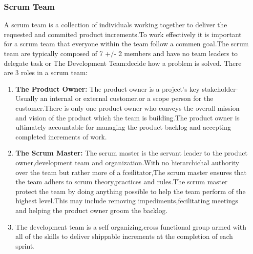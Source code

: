 \documentclass[a4paper, 12pt]{report}
\begin{document}
\subsubsection{Scrum Team} A scrum team is a collection of individuals working together to deliver the requested and commited product increments.To work eﬀectively it is important for a scrum team that everyone within the team follow a commen goal.The scrum team are typically composed of 7 +/- 2 members and have no team leaders to delegate task or The Development Team:\textbf{}decide how a problem is solved. There are 3 roles in a scrum team:
\begin{enumerate}
\item  \textbf{The Product Owner:} The product owner is a project’s key stakeholder-Usually an internal or external customer.or a scope person for the customer.There is only one product owner who conveys the overall mission and vision of the product which the team is building.The product owner is ultimately accountable for managing the product backlog and accepting completed increments of work.
\item  \textbf{The Scrum Master:} The scrum master is the servant leader to the product owner,development team and organization.With no hierarchichal authority over the team but rather more of a fceilitator,The scrum master ensures that the team adhers to scrum theory,practices and rules.The scrum master protect the team by doing anything possible to help the team perform of the highest level.This may include removing impediments,fecilitating meetings and helping the product owner groom the backlog.
\item  The development team is a self organizing,cross functional group armed with all of the skills to deliver shippable increments at the completion of each sprint.
\end{enumerate}

 
\end{document}
